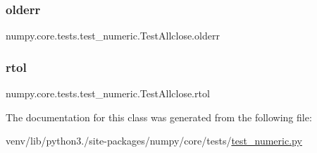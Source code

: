 \subsubsection{\texorpdfstring{olderr}{olderr}}
{\footnotesize\ttfamily numpy.\+core.\+tests.\+test\+\_\+numeric.\+Test\+Allclose.\+olderr}

\mbox{\label{classnumpy_1_1core_1_1tests_1_1test__numeric_1_1TestAllclose_af8df6b930d03e99c8ffbf6850033ac8f}} 
\subsubsection{\texorpdfstring{rtol}{rtol}}
{\footnotesize\ttfamily numpy.\+core.\+tests.\+test\+\_\+numeric.\+Test\+Allclose.\+rtol\hspace{0.3cm}{\ttfamily [static]}}



The documentation for this class was generated from the following file\+:\begin{DoxyCompactItemize}
\item 
venv/lib/python3./site-\/packages/numpy/core/tests/\hyperlink{core_2tests_2test__numeric_8py}{test\+\_\+numeric.\+py}\end{DoxyCompactItemize}
